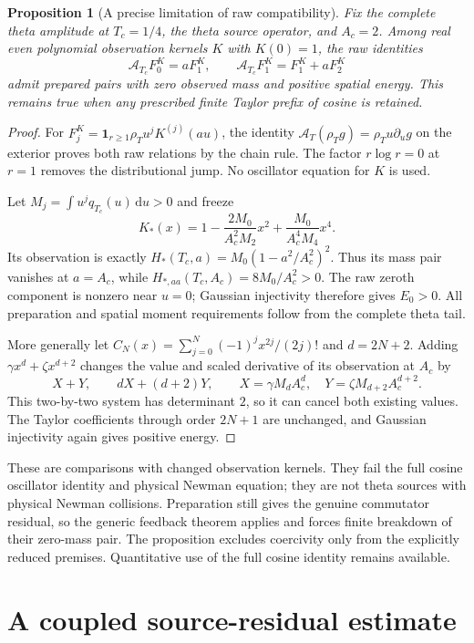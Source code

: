 \documentclass[11pt]{article}
\numberwithin{equation}{section}
\newtheorem{proposition}[theorem]{Proposition}
\newcommand{\dd}{\,\mathrm d}
\begin{document}
\begin{proposition}[A precise limitation of raw compatibility]
\label{prop:kernelfreedom}
Fix the complete theta amplitude at $T_c=1/4$, the theta source
operator, and $A_c=2$. Among real even polynomial observation kernels
$K$ with $K(0)=1$, the raw identities
\[
 \mathcal A_{T_c}F_0^K=aF_1^K,\qquad
 \mathcal A_{T_c}F_1^K=F_1^K+aF_2^K
\]
admit prepared pairs with zero observed mass and positive spatial
energy. This remains true when any prescribed finite Taylor prefix
of cosine is retained.
\end{proposition}
\begin{proof}
For $F_j^K=\mathbf1_{r\ge1}\rho_Tu^jK^{(j)}(au)$, the identity
$\mathcal A_T(\rho_Tg)=\rho_Tu\partial_ug$ on the exterior proves
both raw relations by the chain rule. The factor $r\log r=0$ at
$r=1$ removes the distributional jump. No oscillator equation for
$K$ is used.

Let $M_j=\int u^jq_{T_c}(u)\dd u>0$ and freeze
\[
 K_*(x)=1-\frac{2M_0}{A_c^2M_2}x^2
               +\frac{M_0}{A_c^4M_4}x^4.
\]
Its observation is exactly
$H_*(T_c,a)=M_0(1-a^2/A_c^2)^2$. Thus its mass pair vanishes at
$a=A_c$, while $H_{*,aa}(T_c,A_c)=8M_0/A_c^2>0$.
The raw zeroth component is nonzero near $u=0$; Gaussian injectivity
therefore gives $E_0>0$. All preparation and spatial moment
requirements follow from the complete theta tail.

More generally let
$C_N(x)=\sum_{j=0}^N(-1)^jx^{2j}/(2j)!$ and $d=2N+2$.
Adding $\gamma x^d+\zeta x^{d+2}$ changes the value and scaled
derivative of its observation at $A_c$ by
\[
 X+Y,\qquad dX+(d+2)Y,\qquad
 X=\gamma M_dA_c^d,\quad Y=\zeta M_{d+2}A_c^{d+2}.
\]
This two-by-two system has determinant $2$, so it can cancel both
existing values. The Taylor coefficients through order $2N+1$
are unchanged, and Gaussian injectivity again gives positive energy.
\end{proof}

These are comparisons with changed observation kernels. They fail
the full cosine oscillator identity and physical Newman equation;
they are not theta sources with physical Newman collisions.
Preparation still gives the genuine commutator residual, so the
generic feedback theorem applies and forces finite breakdown of
their zero-mass pair. The proposition excludes coercivity only from
the explicitly reduced premises. Quantitative use of the full cosine
identity remains available.


\section{A coupled source-residual estimate}\label{sec:weightedclosure}
\end{document}

